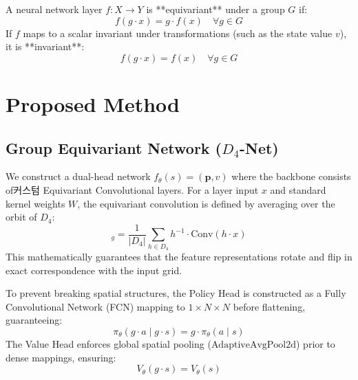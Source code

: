 \documentclass{article}
\begin{document}
A neural network layer $f: X \to Y$ is **equivariant** under a group $G$ if:
\begin{equation}
    f(g \cdot x) = g \cdot f(x) \quad \forall g \in G
\end{equation}
If $f$ maps to a scalar invariant under transformations (such as the state value $v$), it is **invariant**:
\begin{equation}
    f(g \cdot x) = f(x) \quad \forall g \in G
\end{equation}

\section{Proposed Method}

\subsection{Group Equivariant Network ($D_4$-Net)}
We construct a dual-head network $f_\theta(s) = (\mathbf{p}, v)$ where the backbone consists of커스텀 Equivariant Convolutional layers. For a layer input $x$ and standard kernel weights $W$, the equivariant convolution is defined by averaging over the orbit of $D_4$:
\begin{equation}
    [\text{EquiConv}(x)]_g = \frac{1}{|D_4|} \sum_{h \in D_4} h^{-1} \cdot \text{Conv}(h \cdot x)
\end{equation}
This mathematically guarantees that the feature representations rotate and flip in exact correspondence with the input grid. 

To prevent breaking spatial structures, the Policy Head is constructed as a Fully Convolutional Network (FCN) mapping to $1 \times N \times N$ before flattening, guaranteeing:
\begin{equation}
    \pi_\theta(g \cdot a \mid g \cdot s) = g \cdot \pi_\theta(a \mid s)
\end{equation}
The Value Head enforces global spatial pooling ($\text{AdaptiveAvgPool2d}$) prior to dense mappings, ensuring:
\begin{equation}
    V_\theta(g \cdot s) = V_\theta(s)
\end{equation}
\end{document}
